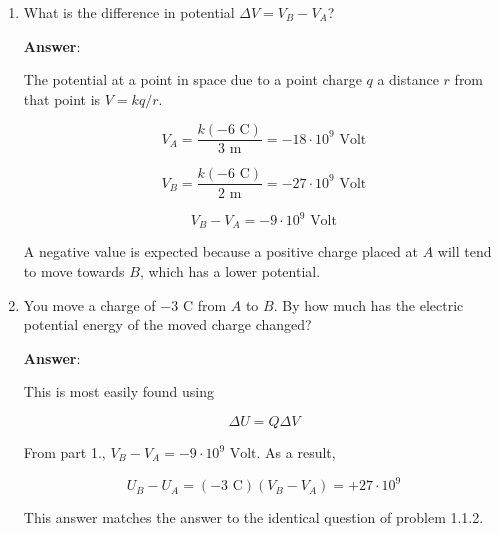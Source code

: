 \documentclass{article}
\begin{document}
\begin{enumerate}

  \item What is the difference in potential $\Delta V = V_B-V_A$?

        \ifsolutions
          \textbf{Answer}:
        
          The potential at a point in space due to a point charge $q$ a distance $r$ from that point is $V={kq}/{r}$.
        
          \begin{equation}
        V_A=\frac{k(-6\text{ C})}{3\text { m}}=-18\cdot 10^9\text{ Volt}
        \end{equation}
        
          \begin{equation}
        V_B=\frac{k(-6\text{ C})}{2\text { m}}=-27\cdot 10^9\text{ Volt}
        \end{equation}
        
          \begin{equation}
        V_B-V_A=-9\cdot 10^9\text{ Volt}
        \end{equation}
        
          A negative value is expected because a positive charge placed at $A$ will tend to move towards $B$, which has a lower potential.
        \else
          \vskip 48pt
        \fi

  \item You move a charge of $-3\text{ C}$ from $A$ to $B$. By how much has the electric potential energy of the moved charge changed?

        \ifsolutions
          \textbf{Answer}:
        
          This is most easily found using
        
          \begin{equation}
        \Delta U = Q{\Delta V}
        \end{equation}
        
          From part 1., $V_B-V_A=-9\cdot 10^9\text{ Volt}$. As a result, 
        
          \begin{equation}
        U_B-U_A= (-3\text{ C})(V_B-V_A)=+27\cdot 10^9
        \end{equation}
        
          This answer matches the answer to the identical question of problem 1.1.2.
        \else
          \vskip 48pt
        \fi


\end{enumerate}
\end{document}
